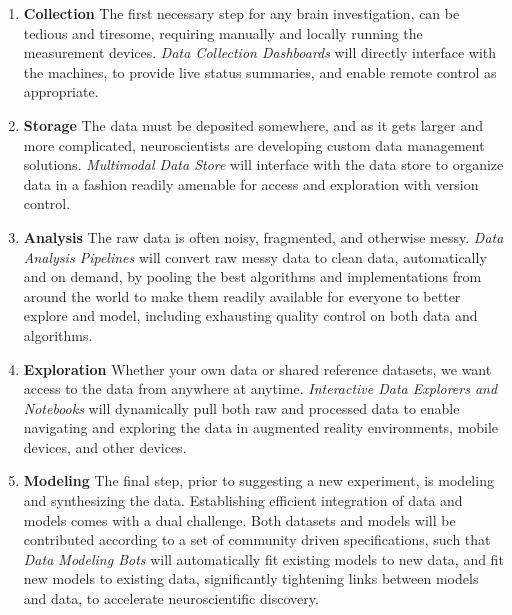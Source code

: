 \documentclass{amsart}
\begin{document}
\begin{enumerate}[1.]
  \item {\bf Collection} The first necessary step for any brain
    investigation, can be tedious and tiresome, requiring manually and
    locally running the measurement devices. \textit{Data Collection
    Dashboards} will directly interface with the machines, to provide live status
    summaries, and enable remote control as appropriate. \\ 

  \item {\bf Storage} The data must be deposited somewhere, and as it
    gets larger and more complicated, neuroscientists are developing
    custom data management solutions. \textit{Multimodal Data Store} will
    interface with the data store to organize data in a fashion readily
    amenable for access and exploration with version control. \\ 

  \item {\bf Analysis} The raw data is often noisy, fragmented, and
    otherwise messy. \textit{Data Analysis Pipelines} will convert raw messy
    data to clean data, automatically and on demand, by pooling the best
    algorithms and implementations from around the world to make them
    readily available for everyone to better explore and model,
    including exhausting quality control on both data and algorithms. \\ 

  \item {\bf Exploration} Whether your own data or shared reference
    datasets, we want access to the data from anywhere at anytime. 
    \textit{Interactive Data Explorers and Notebooks} will dynamically pull both
    raw and processed data to enable navigating and exploring the data
    in augmented reality environments, mobile devices, and other
    devices. \\ 

  \item {\bf Modeling} The final step, prior to suggesting a new
    experiment, is modeling and synthesizing the data. Establishing
    efficient integration of data and models comes with a dual
    challenge. Both datasets and models will be contributed according to
    a set of community driven specifications, such that \textit{Data Modeling
    Bots} will automatically fit existing models to new data, and fit new
    models to existing data, significantly tightening links between
    models and data, to accelerate neuroscientific discovery. \\ 
    

\end{enumerate}
\end{document}
